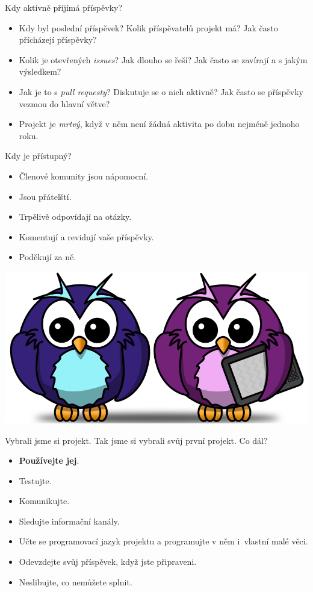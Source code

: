 \documentclass[11pt]{beamer}
\begin{document}
\begin{frame}{Kdy aktivně příjímá příspěvky?}
	\begin{itemize}
		\item Kdy byl poslední příspěvek? Kolik příspěvatelů projekt má? Jak často přícházejí příspěvky?
		\item Kolik je otevřených \textit{issues}? Jak dlouho se řeší? Jak často se zavírají a s jakým výsledkem?
		\item Jak je to s \textit{pull requesty}? Diskutuje se o nich aktivně? Jak často se příspěvky vezmou do hlavní větve?
		\item Projekt je \textit{mrtvý}, když v něm není žádná aktivita po dobu nejméně jednoho roku.
	\end{itemize}
\end{frame}

\begin{frame}{Kdy je přístupný?}
	\begin{itemize}
		\item Členové komunity jsou nápomocní.
		\item Jsou přátelští.
		\item Trpělivě odpovídají na otázky.
		\item Komentují a revidují vaše příspěvky.
		\item Poděkují za ně.
	\end{itemize}

	\includegraphics[width=0.9\linewidth]{images/friends.png}
\end{frame}


\begin{frame}{Vybrali jsme si projekt.}
	Tak jsme si vybrali svůj první projekt. Co dál?
	\begin{itemize}
		\item \textbf{Používejte jej}.
		\item Testujte.
		\item Komunikujte.
		\item Sledujte informační kanály.
		\item Učte se programovací jazyk projektu a programujte v něm i~vlastní malé věci.
		\item Odevzdejte svůj příspěvek, když jste připraveni.
		\item Neslibujte, co nemůžete splnit.
	\end{itemize}
\end{frame}
\end{document}
